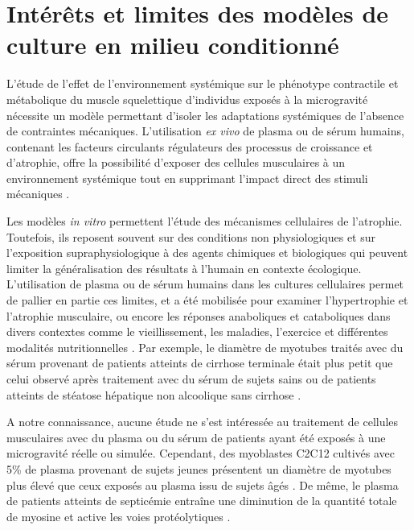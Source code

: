 \documentclass[11pt]{report}
\begin{document}
\section{Intérêts et limites des modèles de culture en milieu conditionné}

L'étude de l'effet de l'environnement systémique sur le phénotype contractile et métabolique du muscle squelettique d'individus exposés à la microgravité nécessite un modèle permettant d'isoler les adaptations systémiques de l'absence de contraintes mécaniques. L'utilisation \textit{ex vivo} de plasma ou de sérum humains, contenant les facteurs circulants régulateurs des processus de croissance et d'atrophie, offre la possibilité d'exposer des cellules musculaires à un environnement systémique tout en supprimant l'impact direct des stimuli mécaniques \parencite{Allen2022Dec}.

\medskip Les modèles \textit{in vitro} permettent l'étude des mécanismes cellulaires de l'atrophie. Toutefois, ils reposent souvent sur des conditions non physiologiques et sur l'exposition supraphysiologique à des agents chimiques et biologiques qui peuvent limiter la généralisation des résultats à l'humain en contexte écologique. L'utilisation de plasma ou de sérum humains dans les cultures cellulaires permet de pallier en partie ces limites, et a été mobilisée pour examiner l'hypertrophie et l'atrophie musculaire, ou encore les réponses anaboliques et cataboliques dans divers contextes comme le vieillissement, les maladies, l'exercice et différentes modalités nutritionnelles \parencite{Allen2022Dec}. Par exemple, le diamètre de myotubes traités avec du sérum provenant de patients atteints de cirrhose terminale était plus petit que celui observé après traitement avec du sérum de sujets sains ou de patients atteints de stéatose hépatique non alcoolique sans cirrhose \parencite{Allen2022Mar}.

A notre connaissance, aucune étude ne s'est intéressée au traitement de cellules musculaires avec du plasma ou du sérum de patients ayant été exposés à une microgravité réelle ou simulée. Cependant, des myoblastes C2C12 cultivés avec 5\% de plasma provenant de sujets jeunes présentent un diamètre de myotubes plus élevé que ceux exposés au plasma issu de sujets âgés \parencite{Kalampouka2018Feb}. De même, le plasma de patients atteints de septicémie entraîne une diminution de la quantité totale de myosine et active les voies protéolytiques \parencite{vanHees2011}.
\end{document}
